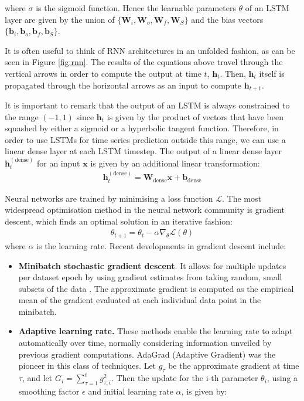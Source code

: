 \documentclass[pdftex,10pt,a4paper,journal]{article}
\theoremstyle{definition}
\theoremstyle{remark}
\newcommand*{\V}[1]{\mathbf{#1}}%
\begin{document}
\begin{multicols}{2}
where $\sigma$ is the sigmoid function. Hence the learnable parameters $\theta$ of an LSTM layer are given by the union of $\{\V{W}_i, \V{W}_o, \V{W}_f, \V{W}_S\}$ and the bias vectors $\{\V{b}_i, \V{b}_o, \V{b}_f, \V{b}_S\}$.
\par It is often useful to think of RNN architectures in an unfolded fashion, as can be seen in Figure \ref{fig:rnn}. The results of the equations above travel through the vertical arrows in order to compute the output at time $t$, $\V{h}_t$. Then, $\V{h}_t$ itself is propagated through the horizontal arrows as an input to compute $\V{h}_{t+1}$.
\par It is important to remark that the output of an LSTM is always constrained to the range $(-1, 1)$ since $\V{h}_t$ is given by the product of vectors that have been squashed by either a sigmoid or a hyperbolic tangent function. Therefore, in order to use LSTMs for time series prediction outside this range, we can use a linear dense layer at each LSTM timestep. The output of a linear dense layer $\V{h}_t^{(\text{dense})}$ for an input $\V{x}$ is given by an additional linear transformation:
\begin{align*} 
    \V{h}_t^{(\text{dense})} = \V{W}_{\text{dense}}\V{x} + \V{b}_{\text{dense}}
\end{align*}
\par Neural networks are trained by minimising a loss function $\mathcal{L}$. The most widespread optimisation method in the neural network community is gradient descent, which finds an optimal solution in an iterative fashion:
\begin{align*}
    \theta_{t+1} = \theta_{t} - \alpha \nabla_\theta \mathcal{L}(\theta) 
\end{align*}
where $\alpha$ is the learning rate. Recent developments in gradient descent include: 
\begin{itemize}
\item \textbf{Minibatch stochastic gradient descent}. It allows for multiple updates per dataset epoch by using gradient estimates from taking random, small subsets of the data \cite{Bottou2010}. The approximate gradient is computed as the empirical mean of the gradient evaluated at each individual data point in the minibatch.
\item \textbf{Adaptive learning rate.} These methods enable the learning rate to adapt automatically over time, normally considering information unveiled by previous gradient computations. AdaGrad (Adaptive Gradient) \cite{Duchi2011} was the pioneer in this class of techniques. Let $g_\tau$ be the approximate gradient at time $\tau$, and let $G_i=\sum_{\tau=1}^t g_{\tau, i}^2$. Then the update for the i-th parameter $\theta_i$, using a smoothing factor $\epsilon$ and initial learning rate $\alpha$, is given by:

\end{itemize}
\end{multicols}
\end{document}
